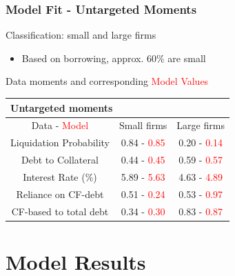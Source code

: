 \documentclass[aspectratio=169,xcolor=table]{beamer}
\begin{document}
\begin{frame}[label=3] \frametitle{Model Fit - Untargeted Moments}


Classification: small and large firms  \small
\begin{itemize}
    \item Based on borrowing, approx. 60\% are small
\end{itemize} \normalsize 
Data moments and corresponding \textcolor{red}{Model Values}

\small
\begin{table}[h!]
    \centering
    \renewcommand{\arraystretch}{0.9}
        \begin{tabular}{c|c|c}
        \multicolumn{3}{l}{\textbf{Untargeted moments}} \\ 
        \toprule
         Data - \textcolor{red}{Model} & Small firms &  Large firms  \\
         \midrule
         Liquidation Probability  & 0.84 - \textcolor{red}{0.85}  & 0.20 - \textcolor{red}{0.14}  \\
         Debt to Collateral & 0.44 - \textcolor{red}{0.45}  & 0.59 - \textcolor{red}{0.57}  \\
         Interest Rate (\%) & 5.89 - \textcolor{red}{5.63}  & 4.63 - \textcolor{red}{4.89}  \\
         Reliance on CF-debt  &  0.51 - \textcolor{red}{0.24}  &  0.53 - \textcolor{red}{0.97}  \\
         CF-based to total debt & 0.34 - \textcolor{red}{0.30}  & 0.83 - \textcolor{red}{0.87}  \\
        \bottomrule
        \end{tabular}
    \label{tab:external calib} 
\end{table}
\normalsize

\end{frame}

\section{Model Results}
\end{document}
